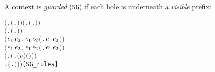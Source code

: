 A context is \emph{guarded} (\texttt{SG}) if each hole is underneath a \emph{visible} prefix:
\begin{alltt}
\HOLTokenTurnstile{} \ensuremath{(}\HOLSymConst{\HOLTokenForall{}}.  \ensuremath{(}\HOLTokenLambda{}. \ensuremath{)}\ensuremath{)} \HOLSymConst{\HOLTokenConj{}} \ensuremath{(}\HOLSymConst{\HOLTokenForall{}} .   \HOLSymConst{\HOLTokenImp{}}  \ensuremath{(}\HOLTokenLambda{}.  \HOLSymConst{\ensuremath{\ldotp}} \ensuremath{)}\ensuremath{)} \HOLSymConst{\HOLTokenConj{}}
   \ensuremath{(}\HOLSymConst{\HOLTokenForall{}} .   \HOLSymConst{\HOLTokenImp{}}  \ensuremath{(}\HOLTokenLambda{}. \HOLSymConst{\ensuremath{\ldotp}} \ensuremath{)}\ensuremath{)} \HOLSymConst{\HOLTokenConj{}}
   \ensuremath{(}\HOLSymConst{\HOLTokenForall{}}\ensuremath{\HOLBoundVar{e}\sb{\mathrm{1}}} \ensuremath{\HOLBoundVar{e}\sb{\mathrm{2}}}.  \ensuremath{\HOLBoundVar{e}\sb{\mathrm{1}}} \HOLSymConst{\HOLTokenConj{}}  \ensuremath{\HOLBoundVar{e}\sb{\mathrm{2}}} \HOLSymConst{\HOLTokenImp{}}  \ensuremath{(}\HOLTokenLambda{}. \ensuremath{\HOLBoundVar{e}\sb{\mathrm{1}}}  \HOLSymConst{\ensuremath{+}} \ensuremath{\HOLBoundVar{e}\sb{\mathrm{2}}} \ensuremath{)}\ensuremath{)} \HOLSymConst{\HOLTokenConj{}}
   \ensuremath{(}\HOLSymConst{\HOLTokenForall{}}\ensuremath{\HOLBoundVar{e}\sb{\mathrm{1}}} \ensuremath{\HOLBoundVar{e}\sb{\mathrm{2}}}.  \ensuremath{\HOLBoundVar{e}\sb{\mathrm{1}}} \HOLSymConst{\HOLTokenConj{}}  \ensuremath{\HOLBoundVar{e}\sb{\mathrm{2}}} \HOLSymConst{\HOLTokenImp{}}  \ensuremath{(}\HOLTokenLambda{}. \ensuremath{\HOLBoundVar{e}\sb{\mathrm{1}}}  \HOLSymConst{\ensuremath{\mid}} \ensuremath{\HOLBoundVar{e}\sb{\mathrm{2}}} \ensuremath{)}\ensuremath{)} \HOLSymConst{\HOLTokenConj{}}
   \ensuremath{(}\HOLSymConst{\HOLTokenForall{}} .   \HOLSymConst{\HOLTokenImp{}}  \ensuremath{(}\HOLTokenLambda{}. \ensuremath{(\nu}\ensuremath{)} \ensuremath{(} \ensuremath{)}\ensuremath{)}\ensuremath{)} \HOLSymConst{\HOLTokenConj{}}
   \HOLSymConst{\HOLTokenForall{}} .   \HOLSymConst{\HOLTokenImp{}}  \ensuremath{(}\HOLTokenLambda{}.  \ensuremath{(} \ensuremath{)} \ensuremath{)}\hfill{[SG_rules]}
\end{alltt}


